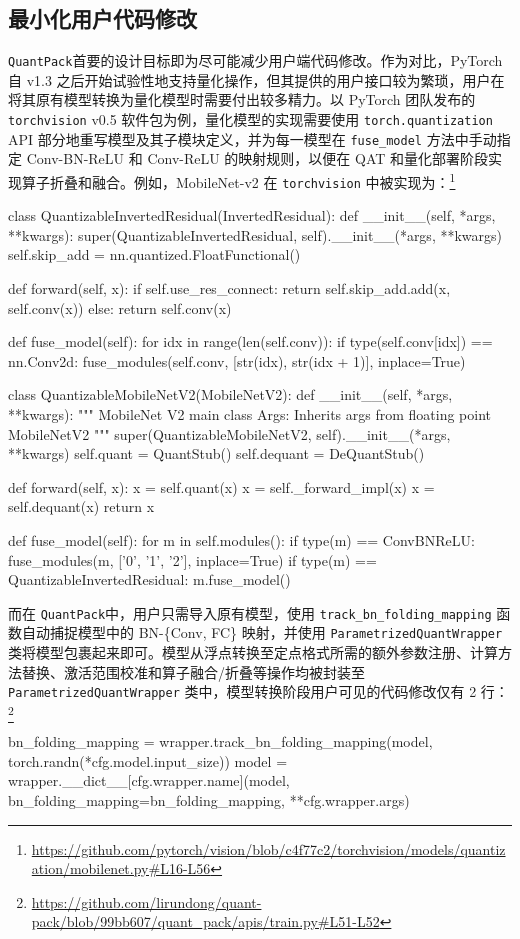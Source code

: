 \documentclass[
  fontset = source,
]{shtthesis}
\providecommand{\QP}{\texttt{QuantPack}}
\begin{document}
\subsection{最小化用户代码修改}
\QP 首要的设计目标即为尽可能减少用户端代码修改。作为对比，PyTorch 自 v1.3 之后开始试验性地支持量化操作，但其提供的用户接口较为繁琐，用户在将其原有模型转换为量化模型时需要付出较多精力。以 PyTorch 团队发布的 \verb|torchvision| v0.5 软件包为例，量化模型的实现需要使用 \verb|torch.quantization| API 部分地重写模型及其子模块定义，并为每一模型在 \verb|fuse_model| 方法中手动指定 Conv-BN-ReLU 和 Conv-ReLU 的映射规则，以便在 QAT 和量化部署阶段实现算子折叠和融合。例如，MobileNet-v2 在 \verb|torchvision| 中被实现为：\footnote{\url{https://github.com/pytorch/vision/blob/c4f77c2/torchvision/models/quantization/mobilenet.py\#L16-L56}}
\begin{python}
class QuantizableInvertedResidual(InvertedResidual):
    def __init__(self, *args, **kwargs):
        super(QuantizableInvertedResidual, self).__init__(*args, **kwargs)
        self.skip_add = nn.quantized.FloatFunctional()

    def forward(self, x):
        if self.use_res_connect:
            return self.skip_add.add(x, self.conv(x))
        else:
            return self.conv(x)

    def fuse_model(self):
        for idx in range(len(self.conv)):
            if type(self.conv[idx]) == nn.Conv2d:
                fuse_modules(self.conv, [str(idx), str(idx + 1)], inplace=True)


class QuantizableMobileNetV2(MobileNetV2):
    def __init__(self, *args, **kwargs):
        """
        MobileNet V2 main class
        Args:
          Inherits args from floating point MobileNetV2
        """
        super(QuantizableMobileNetV2, self).__init__(*args, **kwargs)
        self.quant = QuantStub()
        self.dequant = DeQuantStub()

    def forward(self, x):
        x = self.quant(x)
        x = self._forward_impl(x)
        x = self.dequant(x)
        return x

    def fuse_model(self):
        for m in self.modules():
            if type(m) == ConvBNReLU:
                fuse_modules(m, ['0', '1', '2'], inplace=True)
            if type(m) == QuantizableInvertedResidual:
                m.fuse_model()
\end{python}

而在 \QP 中，用户只需导入原有模型，使用 \verb|track_bn_folding_mapping| 函数自动捕捉模型中的 BN-\{Conv, FC\} 映射，并使用 \verb|ParametrizedQuantWrapper| 类将模型包裹起来即可。模型从浮点转换至定点格式所需的额外参数注册、计算方法替换、激活范围校准和算子融合/折叠等操作均被封装至 \verb|ParametrizedQuantWrapper| 类中，模型转换阶段用户可见的代码修改仅有 2 行：\footnote{\url{https://github.com/lirundong/quant-pack/blob/99bb607/quant_pack/apis/train.py\#L51-L52}}
\begin{python}
bn_folding_mapping = wrapper.track_bn_folding_mapping(model, torch.randn(*cfg.model.input_size))
model = wrapper.__dict__[cfg.wrapper.name](model, bn_folding_mapping=bn_folding_mapping, **cfg.wrapper.args)
\end{python}
\end{document}
